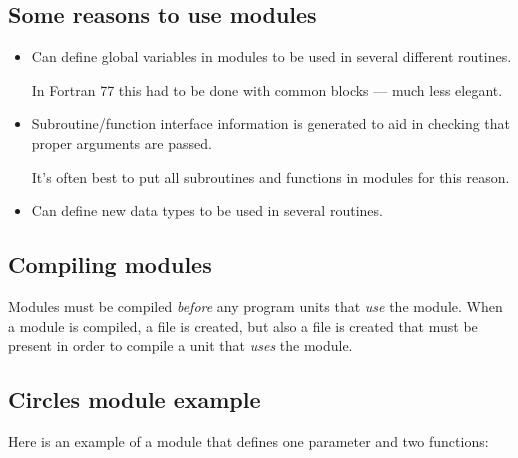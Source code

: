 \documentclass[letterpaper,10pt,english]{sphinxmanual}
\begin{document}
\subsection{Some reasons to use modules}
\label{fortran_modules:some-reasons-to-use-modules}\begin{itemize}
\item {} 
Can define global variables in modules to be used in several different
routines.

In Fortran 77 this had to be done with common blocks — much less elegant.

\item {} 
Subroutine/function interface information is generated to aid in checking
that proper arguments are passed.

It’s often best to put all subroutines and functions in modules for this
reason.

\item {} 
Can define new data types to be used in several routines.

\end{itemize}


\subsection{Compiling modules}
\label{fortran_modules:compiling-modules}
Modules must be compiled \emph{before} any program units that \emph{use} the module.
When a module is compiled, a  file is created, but also a  file is
created that must be present in order to compile a unit that \emph{uses} the
module.


\subsection{Circles module example}
\label{fortran_modules:circles-module-example}
Here is an example of a module that defines one parameter  and
two functions:
\end{document}
